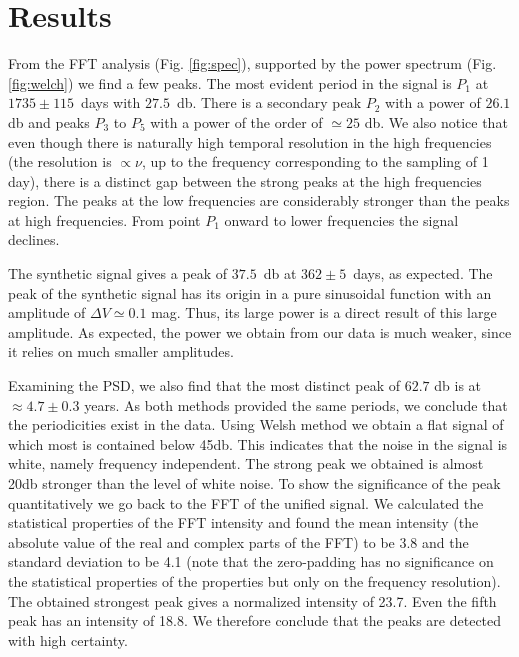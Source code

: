 \documentclass[twocolumn]{aastex62}
\begin{document}
\section{Results}
\label{sec:resultss}

From the FFT analysis (Fig. \ref{fig:spec}), supported by the power spectrum (Fig. \ref{fig:welch}) we find a few peaks.
The most evident period in the signal is $P_1$ at $1735 \pm 115$~days with $27.5$~db. There is a secondary peak $P_2$ with a power of $26.1$ db and peaks $P_3$ to $P_5$ with a power of the order of $\simeq25$ db. We also notice that even though there is naturally high temporal resolution in the high frequencies (the resolution is $\propto \nu$, up to the frequency corresponding to the sampling of 1 day), there is a distinct gap between the strong peaks at the high frequencies region.
The peaks at the low frequencies are considerably stronger than the peaks at high frequencies.
From point $P_1$ onward to lower frequencies the signal declines.

The synthetic signal gives a peak of $37.5$~db at $362 \pm 5$~days, as expected.
The peak of the synthetic signal has its origin in a pure sinusoidal function with an amplitude of $\Delta V \simeq 0.1$ mag. Thus, its large power is a direct result of this large amplitude.
As expected, the power we obtain from our data is much weaker, since it relies on much smaller amplitudes.


Examining the PSD, we also find that the most distinct peak of $62.7$ db is at $\approx 4.7 \pm 0.3$ years.
As both methods provided the same periods, we conclude that the periodicities exist in the data.
Using Welsh method we obtain a flat signal of which most is contained below 45db. This indicates that the noise in the signal is white, namely frequency independent. The strong peak we obtained is almost 20db stronger than the level of white noise.
To show the significance of the peak quantitatively we go back to the FFT of the unified signal.
We calculated the statistical properties of the FFT intensity and found the mean intensity (the absolute value of the real and complex parts of the FFT) to be 3.8 and the standard deviation to be 4.1 (note that the zero-padding has no significance on the statistical properties of the properties but only on the frequency resolution).
The obtained strongest peak gives a normalized intensity of 23.7. Even the fifth peak has an intensity of 18.8.
We therefore conclude that the peaks are detected with high certainty.
\end{document}
